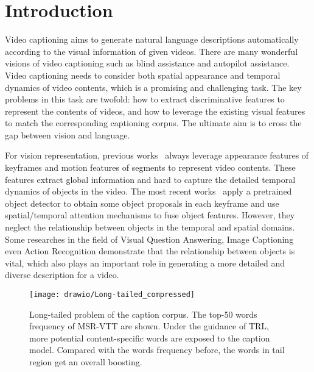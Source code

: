 \documentclass[10pt,twocolumn,letterpaper]{article}
\begin{document}
\section{Introduction}
Video captioning aims to generate natural language descriptions automatically according to the visual information of given videos. There are many wonderful visions of video captioning such as blind assistance and autopilot assistance. Video captioning needs to consider both spatial appearance and temporal dynamics of video contents, which is a promising and challenging task. The key problems in this task are twofold: how to extract discriminative features to represent the contents of videos, and how to leverage the existing visual features to match the  corresponding captioning corpus. The ultimate aim is to cross the gap between vision and language. 

For vision representation, previous works~\cite{Yao2015, Yu2016, Pan2016, Pan2016b, Wang2018a} always leverage appearance features of keyframes and motion features of segments to represent video contents. These features extract global information and hard to capture the detailed temporal dynamics of objects in the video. The most recent works~\cite{Zhang2019,Hu2019} apply a pretrained object detector to obtain some object proposals in each keyframe and use spatial/temporal attention mechanisms to fuse object features. However, they neglect the relationship between objects in the temporal and spatial domains. Some researches in the field of Visual Question Answering, Image Captioning even Action Recognition demonstrate that the relationship between objects is vital, which also plays an important role in generating a more detailed and diverse description for a video.


\begin{figure}
	\centering
	\texttt{[image: drawio/Long-tailed\_compressed]}
	\caption{Long-tailed problem of the caption corpus. The top-50 words frequency of MSR-VTT are shown. Under the guidance of TRL, more potential content-specific words are exposed to the caption model. Compared with the words frequency before, the words in tail region get an overall boosting.}
	\label{fig:long-tail}
	\vspace{-0.6cm}
\end{figure}
\end{document}
